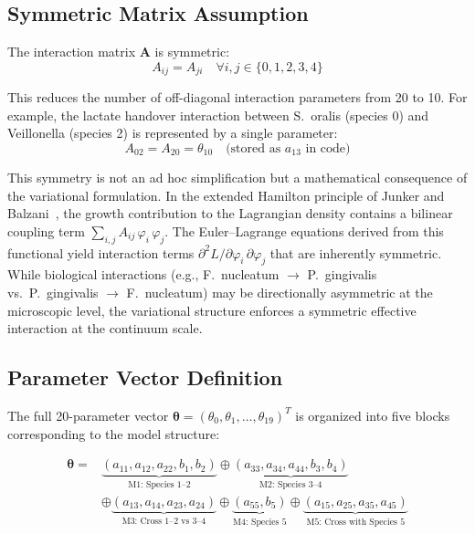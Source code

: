 \documentclass[11pt,a4paper]{article}
\begin{document}
\subsection{Symmetric Matrix Assumption}
\label{sec:symmetric_A}

The interaction matrix $\mathbf{A}$ is symmetric:
\begin{equation}
A_{ij} = A_{ji} \quad \forall i, j \in \{0, 1, 2, 3, 4\}
\end{equation}

This reduces the number of off-diagonal interaction parameters from 20 to 10. For example, the lactate handover interaction between S.~oralis (species 0) and Veillonella (species 2) is represented by a single parameter:
\begin{equation}
A_{02} = A_{20} = \theta_{10} \quad \text{(stored as } a_{13} \text{ in code)}
\end{equation}

This symmetry is not an ad hoc simplification but a mathematical consequence of the variational formulation.
In the extended Hamilton principle of Junker and Balzani~\cite{JunkerBalzani2021ExtendedHamilton}, the growth contribution to the Lagrangian density contains a bilinear coupling term $\sum_{i,j} A_{ij}\,\varphi_i\,\varphi_j$.
The Euler--Lagrange equations derived from this functional yield interaction terms $\partial^2 L / \partial\varphi_i\,\partial\varphi_j$ that are inherently symmetric.
While biological interactions (e.g., F.~nucleatum $\to$ P.~gingivalis vs.\ P.~gingivalis $\to$ F.~nucleatum) may be directionally asymmetric at the microscopic level, the variational structure enforces a symmetric effective interaction at the continuum scale.

\subsection{Parameter Vector Definition}

The full 20-parameter vector $\boldsymbol{\theta} = (\theta_0, \theta_1, \ldots, \theta_{19})^T$ is organized into five blocks corresponding to the model structure:

\begin{equation}
\begin{split}
\boldsymbol{\theta} = & \underbrace{(a_{11}, a_{12}, a_{22}, b_1, b_2)}_{\text{M1: Species 1--2}}
\oplus \underbrace{(a_{33}, a_{34}, a_{44}, b_3, b_4)}_{\text{M2: Species 3--4}} \\
& \oplus \underbrace{(a_{13}, a_{14}, a_{23}, a_{24})}_{\text{M3: Cross 1--2 vs 3--4}}
\oplus \underbrace{(a_{55}, b_5)}_{\text{M4: Species 5}}
\oplus \underbrace{(a_{15}, a_{25}, a_{35}, a_{45})}_{\text{M5: Cross with Species 5}}
\end{split}
\end{equation}
\end{document}
